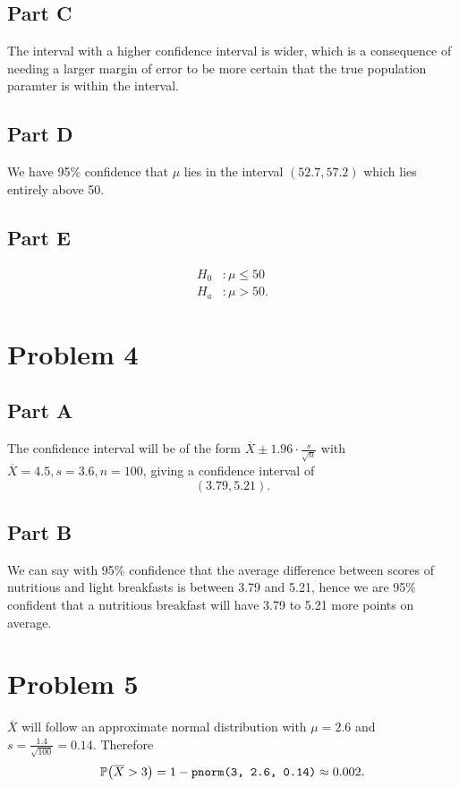 \documentclass[12pt]{extarticle}
\begin{document}
\subsection*{Part C}
The interval with a higher confidence interval is wider, which is a consequence of needing a larger margin of error to be more certain that the true population paramter is within the interval.

\subsection*{Part D}
We have 95\% confidence that $\mu$ lies in the interval $(52.7, 57.2)$ which lies entirely above 50.

\subsection*{Part E}
\begin{align*}
	H_0 &: \mu \leq 50 \\
	H_a &: \mu > 50
.\end{align*}

\section*{Problem 4}
\subsection*{Part A}
The confidence interval will be of the form $\overline{X} \pm 1.96 \cdot \frac{s}{\sqrt{n}}$ with $\overline{X} = 4.5, s = 3.6, n = 100$, giving a confidence interval of
\[
	(3.79, 5.21)
.\]

\subsection*{Part B}
We can say with 95\% confidence that the average difference between scores of nutritious and light breakfasts is between 3.79 and 5.21, hence we are 95\% confident that a nutritious breakfast will have 3.79 to 5.21 more points on average.

\section*{Problem 5}
$\overline{X}$ will follow an approximate normal distribution with $\mu = 2.6$ and $s = \frac{1.4}{\sqrt{100}} = 0.14$. Therefore
\[
	\Prob{\overline{X} > 3} = 1 - \verb|pnorm(3, 2.6, 0.14)| \approx 0.002
.\]
\end{document}
